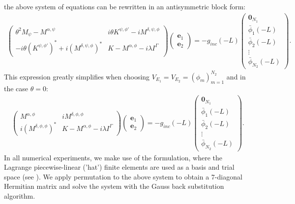 the above system of equations can be rewritten in an antisymmetric block form:
\begin{align*}
\left(\begin{matrix}
\theta^2 M_{\psi}-M^{\alpha,\psi} & i\theta K^{\psi,\phi'}-i M^{\delta,\psi,\phi} \\
-i\theta (K^{\psi,\phi'})^{*}+i (M^{\delta,\psi,\phi})^{*} & K-M^{\alpha,\phi}-i\lambda I^{\Gamma}
\end{matrix}\right)
\left(
\begin{matrix}
\boldsymbol{e}_1\\
\boldsymbol{e}_2
\end{matrix}
\right)=-g_{inc}(-L)
\left(
\begin{matrix}
\boldsymbol{0}_{N_{1}}\\
\bar{\phi}_{1}(-L)\\
\bar{\phi}_{2}(-L)\\
\vdots\\
\bar{\phi}_{N_{2}}(-L)
\end{matrix}
\right).
\end{align*}
This expression greatly simplifies when choosing $V_{E_{1}}=V_{E_{2}}=\left(\phi_{m}\right)_{m=1}^{N_{2}}$ and in the case $\theta=0$:
\begin{align}
\label{eq:simple_system}
\left(\begin{matrix}
M^{\alpha,\phi} & i M^{\delta,\phi,\phi} \\
i (M^{\delta,\phi,\phi})^{*} & K-M^{\alpha,\phi}-i\lambda I^{\Gamma}
\end{matrix}\right)
\left(
\begin{matrix}
\boldsymbol{e}_1\\ 
\boldsymbol{e}_2
\end{matrix}
\right)=-g_{inc}(-L)
\left(
\begin{matrix}
\boldsymbol{0}_{N_{1}}\\
\bar{\phi}_{1}(-L)\\
\bar{\phi}_{2}(-L)\\
\vdots\\
\bar{\phi}_{N_{2}}(-L)
\end{matrix}
\right).
\end{align}
In all numerical experiments, we make use of the formulation, where the Lagrange piecewise-linear ('hat') finite elements are used as a 
basis and trial space (see \cite{brenner}). We apply permutation to the above system 
to obtain a 7-diagonal Hermitian matrix and solve the system with the Gauss back substitution algorithm. 





